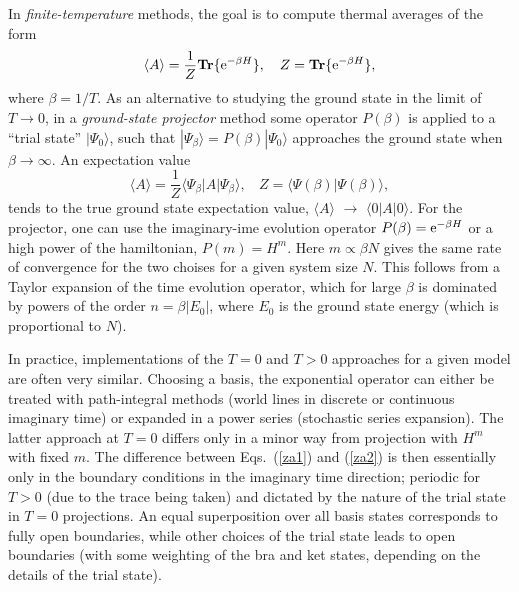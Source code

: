 \documentclass[range]{ar2e}
\begin{document}
In {\it finite-temperature} methods, the goal is to compute thermal averages of the form
\begin{equation}
\langle A\rangle = \frac{1}{Z}{\bf Tr}\{ {\rm e}^{-\beta H}\},~~~
Z = {\bf Tr}\{ {\rm e}^{-\beta H}\},
\label{za1}
\end{equation}
where $\beta=1/T$. As an alternative to studying the ground state in the limit of  $T\to 0$, in a {\it ground-state projector} method some 
operator $P(\beta)$  is applied to a ``trial state'' $|\Psi_0\rangle$, such that $|\Psi_\beta \rangle = P(\beta)|\Psi_0\rangle$ approaches the 
ground state when $\beta \to \infty$. An expectation value
\begin{equation}
\langle A\rangle = \frac{1}{Z}\langle \Psi_\beta|A|\Psi_\beta\rangle,~~~~ Z = \langle \Psi(\beta)|\Psi(\beta)\rangle,
\label{za2}
\end{equation}
tends to the true ground state expectation value, $\langle A\rangle$ $\to$ $\langle 0| A|0\rangle$. For the projector, one can use the imaginary-ime
evolution operator $P(\beta)={\rm e}^{-\beta H}$ or a high power of the hamiltonian, $P(m)=H^m$. Here $m \propto \beta N$ gives the same rate of 
convergence for the two choises for a given system size $N$. This follows from a Taylor expansion of the time evolution operator, which for large 
$\beta$ is dominated by powers of the order $n=\beta |E_0|$, where $E_0$ is the ground state energy (which is proportional to $N$).

In practice, implementations of the $T=0$ and $T>0$ approaches for a given model are often very similar. Choosing a basis, the exponential
operator can either be treated with path-integral methods (world lines in discrete or continuous imaginary time) or expanded in a power series 
(stochastic series expansion). The latter approach at $T=0$ differs only in a minor way from projection with $H^m$ with fixed $m$. The difference 
between Eqs.~(\ref{za1}) and (\ref{za2}) is then essentially only in the boundary conditions in the imaginary time direction; periodic for $T>0$ 
(due to the trace being taken) and dictated by the nature of the trial state in $T=0$ projections. An equal superposition over all basis states 
corresponds to fully open boundaries, while other choices of the trial state leads to open boundaries (with some weighting of the bra and ket 
states, depending on the details of the trial state). 
\end{document}
